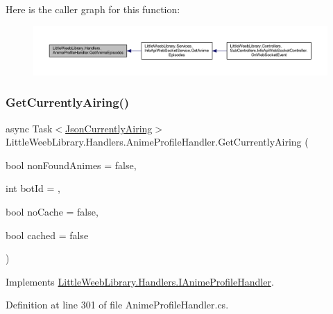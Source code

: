 Here is the caller graph for this function\+:\nopagebreak
\begin{figure}[H]
\begin{center}
\leavevmode
\includegraphics[width=350pt]{class_little_weeb_library_1_1_handlers_1_1_anime_profile_handler_a5b163eb7e68b1e40904fa55454d8ba54_icgraph}
\end{center}
\end{figure}
\mbox{\label{class_little_weeb_library_1_1_handlers_1_1_anime_profile_handler_a7469a40799e1067d871ba87679f54c37}} 
\subsubsection{\texorpdfstring{Get\+Currently\+Airing()}{GetCurrentlyAiring()}}
{\footnotesize\ttfamily async Task$<$\mbox{\hyperlink{class_little_weeb_library_1_1_models_1_1_json_currently_airing}{Json\+Currently\+Airing}}$>$ Little\+Weeb\+Library.\+Handlers.\+Anime\+Profile\+Handler.\+Get\+Currently\+Airing (\begin{DoxyParamCaption}\item[{bool}]{non\+Found\+Animes = {\ttfamily false},  }\item[{int}]{bot\+Id = {},  }\item[{bool}]{no\+Cache = {\ttfamily false},  }\item[{bool}]{cached = {\ttfamily false} }\end{DoxyParamCaption})}



Implements \mbox{\hyperlink{interface_little_weeb_library_1_1_handlers_1_1_i_anime_profile_handler_ad59273ddfe35a2560f3e07879b334c25}{Little\+Weeb\+Library.\+Handlers.\+I\+Anime\+Profile\+Handler}}.



Definition at line 301 of file Anime\+Profile\+Handler.\+cs.



